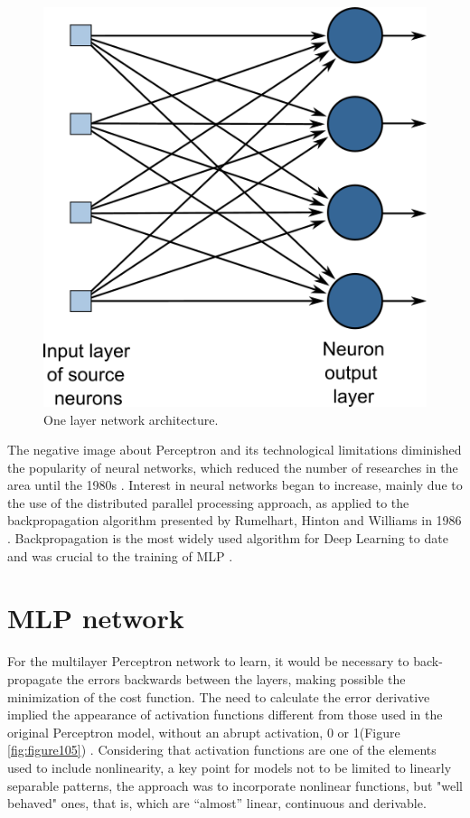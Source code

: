 \begin{figure}
    \centering
    \includegraphics[scale=0.65]{images/figure106.png}
    \caption{One layer network architecture.}
    \label{fig:figure106}
\end{figure}

The negative image about Perceptron and its technological limitations diminished the popularity of neural networks, which reduced the number of researches in the area until the 1980s \cite{goodfellow2016}. Interest in neural networks began to increase, mainly due to the use of the distributed parallel processing approach, as applied to the backpropagation algorithm presented by Rumelhart, Hinton and Williams in 1986 \cite{rumelhart1986learning}. Backpropagation is the most widely used algorithm for Deep Learning  to date and was crucial to the training of MLP \cite{haykin1999}.

\section{MLP network}

For the multilayer Perceptron network to learn, it would be necessary to back-propagate the errors backwards between the layers, making possible the minimization of the cost function. The need to calculate the error derivative implied the appearance of activation functions different from those used in the original Perceptron model, without an abrupt activation, 0 or 1(Figure \ref{fig:figure105}) \cite{haykin1999}.  Considering that activation functions are one of the elements used to include nonlinearity, a key point for models not to be limited to linearly separable patterns, the approach was to incorporate nonlinear functions, but "well behaved" ones, that is, which are “almost” linear, continuous and derivable.

